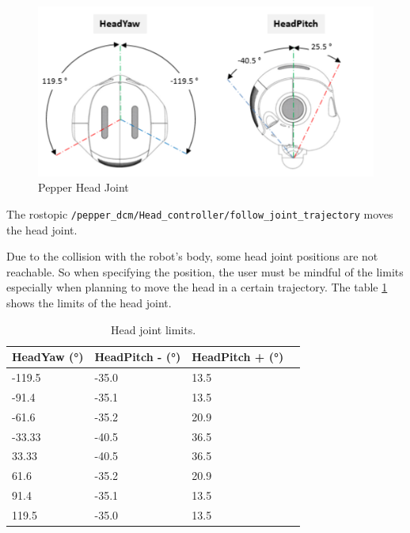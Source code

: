 \documentclass{CSSRforAfrica}
\begin{document}
\newpage

\begin{figure}[!hbpt]
\centering
\includegraphics[scale=0.35]{images/Pepper_Head.png}
\caption{Pepper Head Joint \cite{PepperJoints}}
\label{fig: Pepper Head joint}
\end{figure}

The rostopic \texttt{/pepper\_dcm/Head\_controller/follow\_joint\_trajectory} moves the head joint.

Due to the collision with the robot's body, some head joint positions are not reachable. So when specifying the position, the user must be mindful of the limits especially when planning to move the head in a certain trajectory. The table \ref{tab:head_joint_limits} shows the limits of the head joint.

\begin{longtable}[c]{|l|l|l|l|} 
    \caption{Head joint limits. \cite{PepperJoints}} \label{tab:head_joint_limits}\\
    \hline
    \rowcolor{gray!30}
    \textbf{HeadYaw (°)} & \textbf{HeadPitch - (°)} & \textbf{HeadPitch + (°)} \\ \hline
    \endhead %
    
    -119.5 & -35.0 & 13.5 \\ \hline
    -91.4 & -35.1 & 13.5 \\ \hline
    -61.6 & -35.2 & 20.9 \\ \hline
    -33.33 & -40.5 & 36.5 \\ \hline
    33.33 & -40.5 & 36.5 \\ \hline
    61.6 & -35.2 & 20.9 \\ \hline
    91.4 & -35.1 & 13.5 \\ \hline
    119.5 & -35.0 & 13.5 \\ \hline
\end{longtable}
\end{document}
